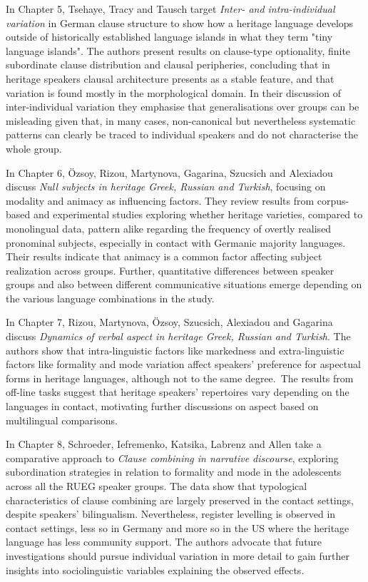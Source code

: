 \documentclass[output=paper,colorlinks,citecolor=brown]{langscibook}
\begin{document}
In Chapter 5, Tsehaye, Tracy and Tausch target \textit{Inter- and intra-individual variation} in German clause structure to show how a heritage language develops outside of historically established language islands in what they term "tiny language islands". The authors present results on clause-type optionality, finite subordinate clause distribution and clausal peripheries, concluding that in heritage speakers clausal architecture presents as a stable feature, and that variation is found mostly in the morphological domain. In their discussion of inter-individual variation they emphasise that generalisations over groups can be misleading given that, in many cases, non-canonical but nevertheless systematic patterns can clearly be traced to individual speakers and do not characterise the whole group.

In Chapter 6, Özsoy, Rizou, Martynova, Gagarina, Szucsich and Alexiadou discuss \textit{Null subjects in heritage Greek, Russian and Turkish}, focusing on modality and animacy as influencing factors. They review results from corpus-based and experimental studies exploring whether heritage varieties, compared to monolingual data, pattern alike regarding the frequency of overtly realised pronominal subjects, especially in contact with Germanic majority languages. Their results indicate that animacy is a common factor affecting subject realization across groups. Further, quantitative differences between speaker groups and also between different communicative situations emerge depending on the various language combinations in the study. 

In Chapter 7, Rizou, Martynova, Özsoy, Szucsich, Alexiadou and Gagarina discuss \textit{Dynamics of verbal aspect in heritage Greek, Russian and Turkish}. The authors show that intra-linguistic factors like markedness and extra-linguistic factors like formality and mode variation affect speakers’ preference for aspectual forms in heritage languages, although not to the same degree.~The results from off-line tasks suggest that heritage speakers’ repertoires vary depending on the languages in contact, motivating further discussions on aspect based on multilingual comparisons.

In Chapter 8, Schroeder, Iefremenko, Katsika, Labrenz and Allen take a comparative approach to \textit{Clause combining in narrative discourse}, exploring subordination strategies in relation to formality and mode in the adolescents across all the RUEG speaker groups. The data show that typological characteristics of clause combining are largely preserved in the contact settings, despite speakers’ bilingualism. Nevertheless, register levelling is observed in contact settings, less so in Germany and more so in the US where the heritage language has less community support. The authors advocate that future investigations should pursue individual variation in more detail to gain further insights into sociolinguistic variables explaining the observed effects.
\end{document}
